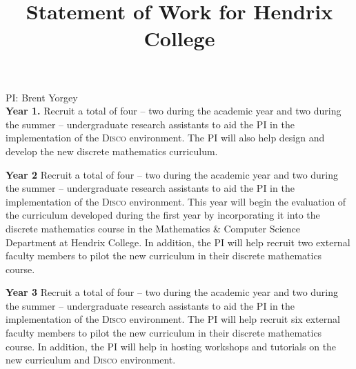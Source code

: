 \documentclass[11pt]{article}
\title{\vspace{-50px}Statement of Work for Hendrix College}
\date{\vspace{-60px}}
\newcommand{\thelang}{\textsc{Disco}\xspace}
\begin{document}
\maketitle  

\noindent
PI: Brent Yorgey\\

\textbf{Year 1.}  Recruit a total of four -- two during the academic
year and two during the summer -- undergraduate research assistants to
aid the PI in the implementation of the \thelang{}
environment.  The PI will also help design and develop the new
discrete mathematics curriculum.

\textbf{Year 2} Recruit a total of four -- two during the academic
year and two during the summer -- undergraduate research assistants to
aid the PI in the implementation of the \thelang{}
environment.  This year will begin the evaluation of the curriculum
developed during the first year by incorporating it into the discrete
mathematics course in the Mathematics \& Computer Science Department
at Hendrix College.  In addition, the PI will help recruit two
external faculty members to pilot the new curriculum in their discrete
mathematics course.

\textbf{Year 3} Recruit a total of four -- two during the academic
year and two during the summer -- undergraduate research assistants to
aid the PI in the implementation of the \thelang{}
environment.  The PI will help recruit six external faculty members to
pilot the new curriculum in their discrete mathematics course.  In
addition, the PI will help in hosting workshops and tutorials on the
new curriculum and \thelang{} environment.
\end{document}
